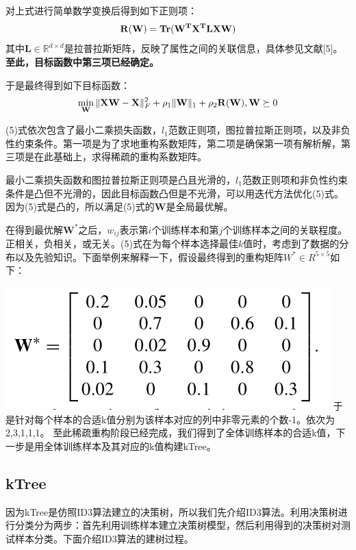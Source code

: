 \documentclass{ctexart}
\begin{document}
	对上式进行简单数学变换后得到如下正则项：
	\begin{equation}
	\mathbf{R(W)} = \mathbf{Tr(W^TX^TLXW)} \notag
	\end{equation}
	其中$ \mathbf L \in \mathbb{R}^{d \times d} $是拉普拉斯矩阵，反映了属性之间的关联信息，具体参见文献[5]。{\bfseries 至此，目标函数中第三项已经确定。}
	
	于是最终得到如下目标函数：
	\begin{equation}
	\min_\mathbf{W} \Arrowvert{\mathbf{XW-X}}\Arrowvert_{F}^{2} + \rho_1 \Arrowvert{\mathbf W}\Arrowvert_1 + \rho_2 \mathbf{R(W)},\mathbf W \succeq 0 \label{eq:objective}
	\end{equation}
	
	(5)式依次包含了最小二乘损失函数，$ l_1 $范数正则项，图拉普拉斯正则项，以及非负性约束条件。第一项是为了求地重构系数矩阵，第二项是确保第一项有解析解，第三项是在此基础上，求得稀疏的重构系数矩阵。
	
	最小二乘损失函数和图拉普拉斯正则项是凸且光滑的，$ l_1 $范数正则项和非负性约束条件是凸但不光滑的，因此目标函数凸但是不光滑，可以用迭代方法优化(5)式。因为(5)式是凸的，所以满足(5)式的$ \mathbf W $是全局最优解。
	
	在得到最优解$ \mathbf W^* $之后，$ w_{ij} $表示第$ i $个训练样本和第$ j $个训练样本之间的关联程度。正相关，负相关，或无关。(5)式在为每个样本选择最佳$ k $值时，考虑到了数据的分布以及先验知识。下面举例来解释一下，假设最终得到的重构矩阵$ W^{*} \in R^{5 \times 5} $如下：
	
	\includegraphics{matrix}	
	于是针对每个样本的合适k值分别为该样本对应的列中非零元素的个数-1。依次为2,3,1,1,1。
	至此稀疏重构阶段已经完成，我们得到了全体训练样本的合适k值，下一步是用全体训练样本及其对应的k值构建kTree。
	\subsection{kTree}
	因为kTree是仿照ID3算法建立的决策树，所以我们先介绍ID3算法。利用决策树进行分类分为两步：首先利用训练样本建立决策树模型，然后利用得到的决策树对测试样本分类。下面介绍ID3算法的建树过程。
\end{document}
